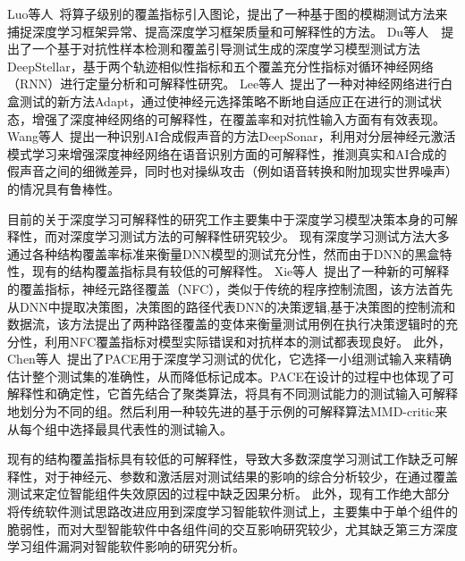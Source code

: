 	Luo等人~将算子级别的覆盖指标引入图论，提出了一种基于图的模糊测试方法来捕捉深度学习框架异常、提高深度学习框架质量和可解释性的方法。
	Du等人~~提出了一个基于对抗性样本检测和覆盖引导测试生成的深度学习模型测试方法DeepStellar，基于两个轨迹相似性指标和五个覆盖充分性指标对循环神经网络（RNN）进行定量分析和可解释性研究。
	Lee等人~提出了一种对神经网络进行白盒测试的新方法Adapt，通过使神经元选择策略不断地自适应正在进行的测试状态，增强了深度神经网络的可解释性，在覆盖率和对抗性输入方面有有效表现。
	Wang等人~提出一种识别AI合成假声音的方法DeepSonar，利用对分层神经元激活模式学习来增强深度神经网络在语音识别方面的可解释性，推测真实和AI合成的假声音之间的细微差异，同时也对操纵攻击（例如语音转换和附加现实世界噪声）的情况具有鲁棒性。
\fi



目前的关于深度学习可解释性的研究工作主要集中于深度学习模型决策本身的可解释性，而对深度学习测试方法的可解释性研究较少。
现有深度学习测试方法大多通过各种结构覆盖率标准来衡量DNN模型的测试充分性，然而由于DNN的黑盒特性，现有的结构覆盖指标具有较低的可解释性。
Xie等人~提出了一种新的可解释的覆盖指标，神经元路径覆盖（NFC），类似于传统的程序控制流图，该方法首先从DNN中提取决策图，决策图的路径代表DNN的决策逻辑,基于决策图的控制流和数据流，该方法提出了两种路径覆盖的变体来衡量测试用例在执行决策逻辑时的充分性，利用NFC覆盖指标对模型实际错误和对抗样本的测试都表现良好。
此外，Chen等人~提出了PACE用于深度学习测试的优化，它选择一小组测试输入来精确估计整个测试集的准确性，从而降低标记成本。PACE在设计的过程中也体现了可解释性和确定性，它首先结合了聚类算法，将具有不同测试能力的测试输入可解释地划分为不同的组。然后利用一种较先进的基于示例的可解释算法MMD-critic来从每个组中选择最具代表性的测试输入。

现有的结构覆盖指标具有较低的可解释性，导致大多数深度学习测试工作缺乏可解释性，对于神经元、参数和激活层对测试结果的影响的综合分析较少，在通过覆盖测试来定位智能组件失效原因的过程中缺乏因果分析。
此外，现有工作绝大部分将传统软件测试思路改进应用到深度学习智能软件测试上，主要集中于单个组件的脆弱性，而对大型智能软件中各组件间的交互影响研究较少，尤其缺乏第三方深度学习组件漏洞对智能软件影响的研究分析。




